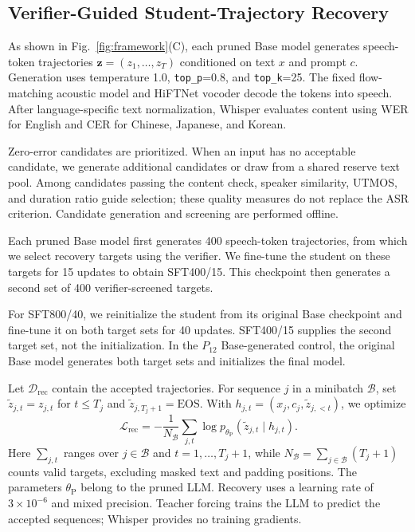 \documentclass{article}
\begin{document}
\subsection{Verifier-Guided Student-Trajectory Recovery}
\label{sec:verifier_recovery}

As shown in Fig.~\ref{fig:framework}(C), each pruned Base model
generates speech-token trajectories
$\mathbf{z}=(z_1,\ldots,z_T)$ conditioned on text $x$ and prompt $c$.
Generation uses temperature 1.0, \texttt{top\_p}=0.8, and
\texttt{top\_k}=25. The fixed flow-matching acoustic model and
HiFTNet vocoder decode the tokens into speech. After
language-specific text normalization, Whisper evaluates content
using WER for English and CER for Chinese, Japanese, and Korean.

Zero-error candidates are prioritized. When an input has no
acceptable candidate, we generate additional candidates or draw
from a shared reserve text pool. Among candidates passing the
content check, speaker similarity, UTMOS, and duration ratio guide
selection; these quality measures do not replace the ASR criterion.
Candidate generation and screening are performed offline.

Each pruned Base model first generates 400 speech-token
trajectories, from which we select recovery targets using the
verifier. We fine-tune the student on these targets for 15 updates
to obtain SFT400/15. This checkpoint then
generates a second set of 400 verifier-screened targets.

For SFT800/40, we reinitialize the student from its original Base
checkpoint and fine-tune it on both target sets for 40 updates.
SFT400/15 supplies the second target set, not the initialization.
In the \(P_{12}\) Base-generated control, the original Base model
generates both target sets and initializes the final model.

Let $\mathcal{D}_{\mathrm{rec}}$ contain the accepted trajectories.
For sequence $j$ in a minibatch $\mathcal B$, set
$\tilde z_{j,t}=z_{j,t}$ for $t\leq T_j$ and
$\tilde z_{j,T_j+1}=\mathrm{EOS}$. With
$h_{j,t}=(x_j,c_j,\tilde z_{j,<t})$, we optimize
\begin{equation}
\mathcal{L}_{\mathrm{rec}}
=-\frac{1}{N_{\mathcal B}}\sum_{j,t}
\log p_{\theta_{\mathrm P}}
(\tilde z_{j,t}\mid h_{j,t}).
\label{eq:recovery_loss}
\end{equation}
Here $\sum_{j,t}$ ranges over $j\in\mathcal B$ and
$t=1,\ldots,T_j+1$, while
$N_{\mathcal B}=\sum_{j\in\mathcal B}(T_j+1)$ counts valid targets,
excluding masked text and padding positions. The parameters
$\theta_{\mathrm P}$ belong to the pruned LLM. Recovery uses a
learning rate of $3\times10^{-6}$ and mixed precision. Teacher
forcing trains the LLM to predict the accepted sequences; Whisper
provides no training gradients.
\end{document}
